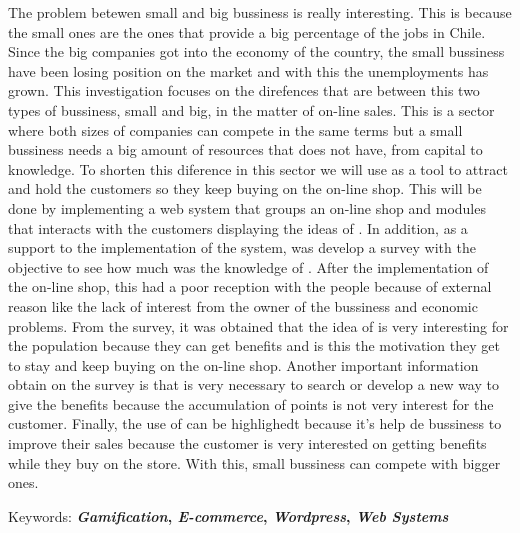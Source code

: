 The problem betewen small and big bussiness is really interesting. This is because the small ones are the ones
that provide a big percentage of the jobs in Chile. Since the big companies got into the economy of the country,
the small bussiness have been losing position on the market and with this the unemployments has grown.
This investigation focuses on the direfences that are between this two types of bussiness, small and big, 
in the matter of on-line sales. This is a sector where both sizes of companies can compete in the same terms but
a small bussiness needs a big amount of resources that does not have, from capital to knowledge.
To shorten this diference in this sector we will use {\gam} as a tool to attract and hold the customers
so they keep buying on the on-line shop.
This will be done by implementing a web system that groups an on-line shop and modules that interacts with
the customers displaying the ideas of {\gam}. In addition, as a support to the implementation of the system, 
was develop a survey with the objective to see how much was the knowledge of {\gam}.
After the implementation of the on-line shop, this had a poor reception with the people because of external
reason like the lack of interest from the owner of the bussiness and economic problems. From the survey,
it was obtained that the idea of {\gam} is very interesting for the population because they can get benefits
and is this the motivation they get to stay and keep buying on the on-line shop. Another important information
obtain on the survey is that is very necessary to search or develop a new way to give the benefits because
the accumulation of points is not very interest for the customer. 
Finally, the use of {\gam} can be highlighedt because it's help de bussiness to improve their sales because
the customer is very interested on getting benefits while they buy on the store. With this, small bussiness 
can compete with bigger ones.

Keywords: \textbf{\emph{Gamification}, \emph{E-commerce}, \emph{Wordpress}, \emph{Web Systems}}
